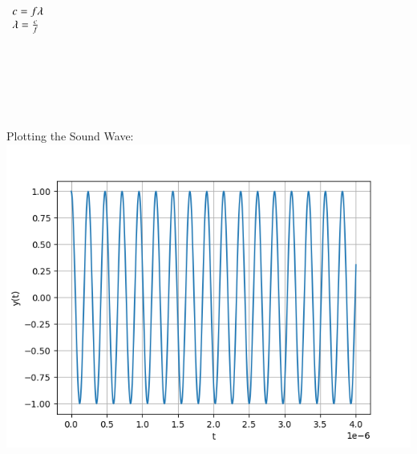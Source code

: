 \documentclass[journal,12pt,twocolumn]{IEEEtran}
\theoremstyle{remark}
\begin{document}
$\begin{array}{ll}
c= f \lambda \notag \\
\lambda = \frac{c}{f} \notag 
\end{array}$
\\
\\ \\ \\ \\ \\ \\

Plotting the Sound Wave:
\includegraphics[scale=0.7]{images/plot.png}




        
        
        
             
             
        

        













\renewcommand{\thefigure}{\theenumi}
\renewcommand{\thetable}{\theenumi}
\end{document}
